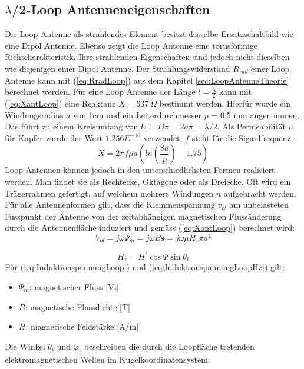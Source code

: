 \subsection{$\lambda$/2-Loop Antenneneigenschaften}
Die Loop Antenne als strahlendes Element besitzt dasselbe Ersatzschaltbild wie eine Dipol Antenne. Ebenso zeigt die Loop Antenne eine torusförmige Richtcharakteristik. Ihre strahlenden Eigenschaften sind jedoch nicht dieselben wie diejenigen einer Dipol Antenne. Der Strahlungswiderstand $R_{rad}$ einer Loop Antenne kann mit (\ref{eq:RradLoop}) aus dem Kapitel \ref{sec:LoopAntenneTheorie} berechnet werden. Für eine Loop Antenne der Länge $l=\frac{\lambda}{2}$ kann mit (\ref{eq:XantLoop}) eine Reaktanz $X = 637 \ \Omega$ bestimmt werden. Hierfür wurde ein Windungsradius $a$ von 1cm und ein Leiterdurchmesser $p$ = 0.5 mm angenommen. Das führt zu einem Kreisumfang von $U=D\pi=2a\pi=\lambda /2$. Als Permeabilität $\mu $ für Kupfer wurde der Wert $1.256E^{-10}$ verwendet, $f$ steht für die Siganlfrequenz \cite{Antenne_Theory_Xant_Loop}.
\begin{equation}\label{eq:XantLoop}
X= 2\pi f\mu a(ln \left( \frac{8a}{p} \right)-1.75)
\end{equation}
Loop Antennen können jedoch in den unterschiedlichsten Formen realisiert werden. Man findet sie als Rechtecke, Oktagone oder als Dreiecke. Oft wird ein Trägerrahmen gefertigt, auf welchem mehrere Windungen $n$ aufgebracht werden. Für alle Antennenformen gilt, dass die Klemmenspannung $v_{ol}$ am unbelasteten Fusspunkt der Antenne von der zeitabhängigen magnetischen Flussänderung durch die Antennenfläche induziert und gemäss (\ref{eq:XantLoop}) berechnet wird:
\begin{equation}\label{eq:InduktionspannungLoop}
V_{ol}= j\omega\Psi_{m}=j\omega B\textbf{s}= j\omega\mu H_{z}\pi a^{2}
\end{equation}

\begin{equation}\label{eq:InduktionspannungLoopHz}
H_{z}=H^{i}\cos\Psi\sin\theta_{i}
\end{equation}
Für (\ref{eq:InduktionspannungLoop}) und (\ref{eq:InduktionspannungLoopHz}) gilt: \\

\begin{itemize}
\item $\Psi_{m}$: magnetischer Fluss [Vs]
\item $B$: magnetische Flussdichte [T]
\item $H$: magnetische Feldstärke [A/m]
\end{itemize}
Die Winkel $\theta_{i}$ und $\varphi_{i}$ beschreiben die durch die Loopfläche tretenden elektromagnetischen Wellen im  Kugelkoordinatensystem.

